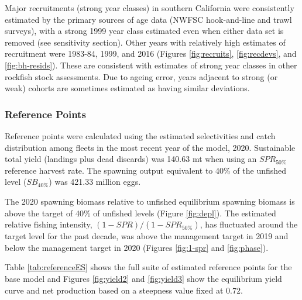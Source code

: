 \documentclass[11pt,
  english,
  a4paper,
]{article}
\begin{document}
Major recruitments (strong year classes) in southern California were consistently estimated by the primary sources of age data (NWFSC hook-and-line and trawl surveys), with a strong 1999 year class estimated even when either data set is removed (see sensitivity section). Other years with relatively high estimates of recruitment were 1983-84, 1999, and 2016 (Figures \ref{fig:recruits}, \ref{fig:recdevs}, and \ref{fig:bh-resids}). These are consistent with estimates of strong year classes in other rockfish stock assessments. Due to ageing error, years adjacent to strong (or weak) cohorts are sometimes estimated as having similar deviations.


\hypertarget{reference-points-1}{%
\subsubsection{Reference Points}\label{reference-points-1}}

\leavevmode\tagmcend\tagstructend

Reference points were calculated using the estimated selectivities and catch distribution among fleets in the most recent year of the model, 2020. Sustainable total yield (landings plus dead discards) was 140.63 mt when using an {\(SPR_{50\%}\)\leavevmode\tagmcend\tagstructend} reference harvest rate. The spawning output equivalent to 40\% of the unfished level ({\(SB_{40\%}\)\leavevmode\tagmcend\tagstructend}) was 421.33 million eggs.

The 2020 spawning biomass relative to unfished equilibrium spawning biomass is above the target of 40\% of unfished levels (Figure \ref{fig:depl}). The estimated relative fishing intensity, {\((1-SPR)/(1-SPR_{50\%})\)\leavevmode\tagmcend\tagstructend}, has fluctuated around the target level for the past decade, was above the management target in 2019 and below the management target in 2020 (Figures \ref{fig:1-spr} and \ref{fig:phase}).

Table \ref{tab:referenceES} shows the full suite of estimated reference points for the base model and Figures \ref{fig:yield2} and \ref{fig:yield3} show the equilibrium yield curve and net production based on a steepness value fixed at 0.72.

\end{document}
